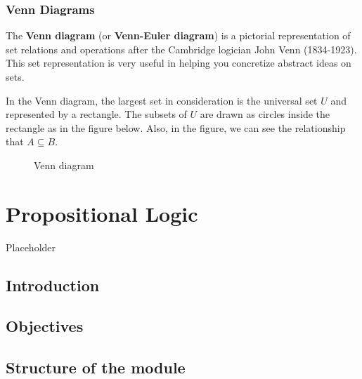 \documentclass[]{book}
\theoremstyle{definition}
\theoremstyle{definition}
\theoremstyle{definition}
\theoremstyle{remark}
\begin{document}
\hypertarget{venn-diagrams}{%
\subsection*{Venn Diagrams}\label{venn-diagrams}}

The \textbf{Venn diagram} (or \textbf{Venn-Euler diagram}) is a pictorial representation of set relations and operations after the Cambridge logician John Venn (1834-1923). This set representation is very useful in helping you concretize abstract ideas on sets.

In the Venn diagram, the largest set in consideration is the universal set \(U\) and represented by a rectangle. The subsets of \(U\) are drawn as circles inside the rectangle as in the figure below. Also, in the figure, we can see the relationship that \(A \subseteq B\).

\begin{figure}[h]
\begin{center}
\end{center}
\caption{Venn diagram}
\label{subset}
\end{figure}

\hypertarget{logic}{%
\chapter{Propositional Logic}\label{logic}}

Placeholder

\hypertarget{introduction-1}{%
\section{Introduction}\label{introduction-1}}

\hypertarget{objectives-1}{%
\section{Objectives}\label{objectives-1}}

\hypertarget{structure-of-the-module-1}{%
\section{Structure of the module}\label{structure-of-the-module-1}}
\end{document}
